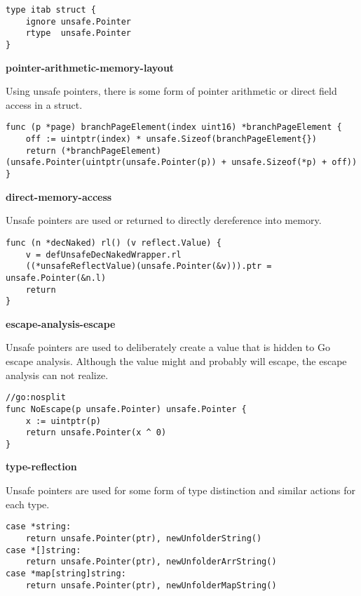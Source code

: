 \begin{lstlisting}[language=Golang, label=lst:survey-small-classexample-data-structure, caption=Usage class example: data-structure]
type itab struct {
    ignore unsafe.Pointer
    rtype  unsafe.Pointer
}
\end{lstlisting}


\textbf{pointer-arithmetic-memory-layout}

Using unsafe pointers, there is some form of pointer arithmetic or direct field access in a struct.

\begin{lstlisting}[language=Golang, label=lst:survey-small-classexample-pointer-arithmetic-memory-layout, caption=Usage class example: pointer-arithmetic-memory-layout]
func (p *page) branchPageElement(index uint16) *branchPageElement {
    off := uintptr(index) * unsafe.Sizeof(branchPageElement{})
    return (*branchPageElement)(unsafe.Pointer(uintptr(unsafe.Pointer(p)) + unsafe.Sizeof(*p) + off))
}
\end{lstlisting}


\textbf{direct-memory-access}

Unsafe pointers are used or returned to directly dereference into memory.

\begin{lstlisting}[language=Golang, label=lst:survey-small-classexample-direct-memory-access, caption=Usage class example: direct-memory-access]
func (n *decNaked) rl() (v reflect.Value) {
    v = defUnsafeDecNakedWrapper.rl
    ((*unsafeReflectValue)(unsafe.Pointer(&v))).ptr = unsafe.Pointer(&n.l)
    return
}
\end{lstlisting}


\textbf{escape-analysis-escape}

Unsafe pointers are used to deliberately create a value that is hidden to Go escape analysis.
Although the value might and probably will escape, the escape analysis can not realize.

\begin{lstlisting}[language=Golang, label=lst:survey-small-classexample-escape-analysis-escape, caption=Usage class example: escape-analysis-escape]
//go:nosplit
func NoEscape(p unsafe.Pointer) unsafe.Pointer {
    x := uintptr(p)
    return unsafe.Pointer(x ^ 0)
}
\end{lstlisting}


\textbf{type-reflection}

Unsafe pointers are used for some form of type distinction and similar actions for each type.

\begin{lstlisting}[language=Golang, label=lst:survey-small-classexample-type-reflection, caption=Usage class example: type-reflection]
case *string:
    return unsafe.Pointer(ptr), newUnfolderString()
case *[]string:
    return unsafe.Pointer(ptr), newUnfolderArrString()
case *map[string]string:
    return unsafe.Pointer(ptr), newUnfolderMapString()
\end{lstlisting}
